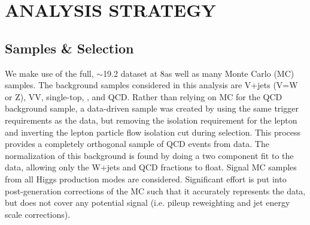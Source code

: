 %
%
%



\chapter{\uppercase {Analysis Strategy}}

\section{Samples \& Selection}
We make use of the full, $\sim$19.2 dataset at 8\tev as well as many Monte Carlo (MC) samples.
The background samples considered in this analysis are V+jets (V=W or Z), VV, single-top, \ttbar, and QCD. 
Rather than relying on MC for the QCD background sample, a data-driven sample was created by using the same trigger requirements as the data, but removing the isolation requirement for the lepton and inverting the lepton particle flow isolation cut during selection.
This process provides a completely orthogonal sample of QCD events from data.
The normalization of this background is found by doing a two component fit to the data, allowing only the W+jets and QCD fractions to float.
Signal MC samples from all Higgs production modes are considered.
Significant effort is put into post-generation corrections of the MC such that it accurately represents the data, but does not cover any potential signal (i.e. pileup reweighting and jet energy scale corrections).

